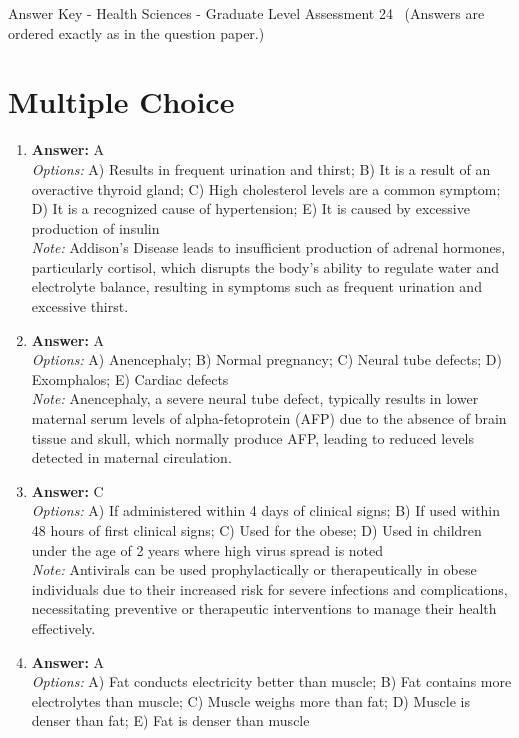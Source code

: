 \documentclass[12pt]{article}
\begin{document}
\begin{center}
Answer Key - Health Sciences - Graduate Level Assessment 24 \
\small (Answers are ordered exactly as in the question paper.)
\end{center}

\section*{Multiple Choice}
\begin{enumerate}[label=\arabic*.]
\item \textbf{Answer:} A
\\ \textit{Options:} A) Results in frequent urination and thirst; B) It is a result of an overactive thyroid gland; C) High cholesterol levels are a common symptom; D) It is a recognized cause of hypertension; E) It is caused by excessive production of insulin
\\ \textit{Note:} Addison's Disease leads to insufficient production of adrenal hormones, particularly cortisol, which disrupts the body's ability to regulate water and electrolyte balance, resulting in symptoms such as frequent urination and excessive thirst.
\item \textbf{Answer:} A
\\ \textit{Options:} A) Anencephaly; B) Normal pregnancy; C) Neural tube defects; D) Exomphalos; E) Cardiac defects
\\ \textit{Note:} Anencephaly, a severe neural tube defect, typically results in lower maternal serum levels of alpha-fetoprotein (AFP) due to the absence of brain tissue and skull, which normally produce AFP, leading to reduced levels detected in maternal circulation.
\item \textbf{Answer:} C
\\ \textit{Options:} A) If administered within 4 days of clinical signs; B) If used within 48 hours of first clinical signs; C) Used for the obese; D) Used in children under the age of 2 years where high virus spread is noted
\\ \textit{Note:} Antivirals can be used prophylactically or therapeutically in obese individuals due to their increased risk for severe infections and complications, necessitating preventive or therapeutic interventions to manage their health effectively.
\item \textbf{Answer:} A
\\ \textit{Options:} A) Fat conducts electricity better than muscle; B) Fat contains more electrolytes than muscle; C) Muscle weighs more than fat; D) Muscle is denser than fat; E) Fat is denser than muscle

\end{enumerate}
\end{document}
